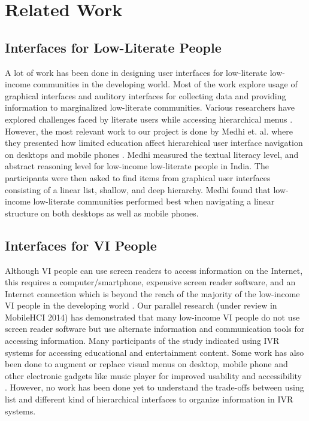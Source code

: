 \documentclass{sigchi}
\begin{document}
\section{Related Work}

\subsection{Interfaces for Low-Literate People}
A lot of work has been done in designing user interfaces for low-literate low-income communities in the developing world. Most of the work explore usage of graphical interfaces \cite{Grisedale1997,Medhi2011a,Medhi2008,Ghosh2003} and auditory interfaces \cite{Cuendet2013,Agarwal2010,Mudliar2013} for collecting data and providing information to marginalized low-literate communities. Various researchers have explored challenges faced by literate users while accessing hierarchical menus \cite{Allen1983,Chaudry2012}. However, the most relevant work to our project is done by Medhi et. al. where they presented how limited education affect hierarchical user interface navigation on desktops and mobile phones \cite{Medhi2013a,Medhi2013b}. Medhi measured the textual literacy level, and abstract reasoning level for low-income low-literate people in India. The participants were then asked to find items from graphical user interfaces consisting of a linear list, shallow, and deep hierarchy. Medhi found that low-income low-literate communities performed best when navigating a linear structure on both desktops as well as mobile phones.

\subsection{Interfaces for VI People}
Although VI people can use screen readers to access information on the Internet, this requires a computer/smartphone, expensive screen reader software, and an Internet connection which is beyond the reach of the majority of the low-income VI people in the developing world \cite{McCarthy2012}. Our parallel research (under review in MobileHCI 2014) has demonstrated that many low-income VI people do not use screen reader software but use alternate information and communication tools for accessing information. Many participants of the study indicated using IVR systems for accessing educational and entertainment content. Some work has also been done to augment or replace visual menus on desktop, mobile phone and other electronic gadgets like music player for improved usability and accessibility \cite{Yalla2008,Zhao2007,Jeon2012}. However, no work has been done yet to understand the trade-offs between using list and different kind of hierarchical interfaces to organize information in IVR systems.
\end{document}
